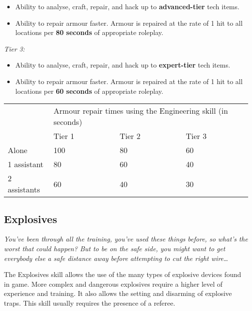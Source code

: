 \documentclass{scrbook}
\begin{document}
\begin{itemize}
\item Ability to analyse, craft, repair, and hack up to \textbf{advanced-tier} tech items.

\item Ability to repair armour faster. Armour is repaired at the rate of 1 hit to all locations per \textbf{80 seconds} of appropriate roleplay.

\end{itemize}
\textit{Tier 3:}

\begin{itemize}
\item Ability to analyse, craft, repair, and hack up to \textbf{expert-tier} tech items.

\item Ability to repair armour faster. Armour is repaired at the rate of 1 hit to all locations per \textbf{60 seconds} of appropriate roleplay.

\end{itemize}

\begin{table}
\begin{tabular}{|l|l|l|l|} \hline 
\multirow{1}{*}{}& \multicolumn{3}{|l|}{Armour repair times using the Engineering skill (in seconds)} \\
\cline{2-2}\cline{3-3}\cline{4-4} & Tier 1 & Tier 2 & Tier 3 \\
 \hline Alone & 100 & 80 & 60 \\
 \hline 1 assistant & 80 & 60 & 40 \\
 \hline 2 assistants & 60 & 40 & 30 \\
 \hline \end{tabular}

\end{table}

\subsection{Explosives}

\textit{You've been through all the training, you've used these things before, so what's the worst that could happen? But to be on the safe side, you might want to get everybody else a safe distance away before attempting to cut the right wire{\dots}}

The Explosives skill allows the use of the many types of explosive devices found in game. More complex and dangerous explosives require a higher level of experience and training. It also allows the setting and disarming of explosive traps. This skill usually requires the presence of a referee.
\end{document}
